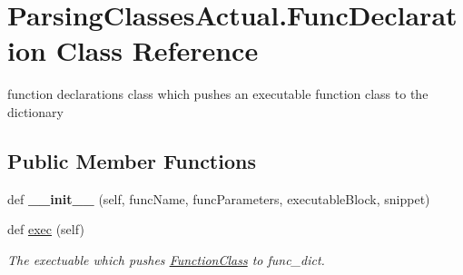 \hypertarget{class_parsing_classes_actual_1_1_func_declaration}{}\section{Parsing\+Classes\+Actual.\+Func\+Declaration Class Reference}
\label{class_parsing_classes_actual_1_1_func_declaration}


function declarations class which pushes an executable function class to the dictionary  


\subsection*{Public Member Functions}
\begin{DoxyCompactItemize}
\item 
\mbox{\label{class_parsing_classes_actual_1_1_func_declaration_a43ab858437296fcce5eafd0c096c248b}} 
def {\bfseries \+\_\+\+\_\+init\+\_\+\+\_\+} (self, func\+Name, func\+Parameters, executable\+Block, snippet)
\item 
\mbox{\label{class_parsing_classes_actual_1_1_func_declaration_a6dc7388f45583a800ceb973146069b7c}} 
def \hyperlink{class_parsing_classes_actual_1_1_func_declaration_a6dc7388f45583a800ceb973146069b7c}{exec} (self)
\begin{DoxyCompactList}\small\item\em The exectuable which pushes \hyperlink{class_parsing_classes_actual_1_1_function_class}{Function\+Class} to func\+\_\+dict. \end{DoxyCompactList}\end{DoxyCompactItemize}
